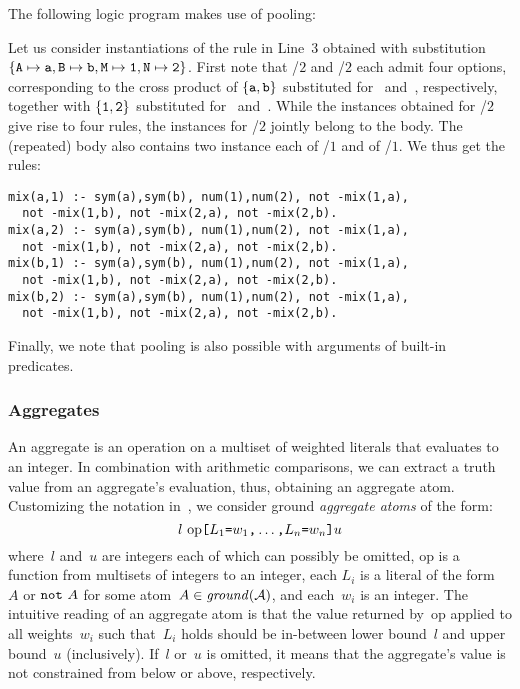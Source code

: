 \begin{example}\label{ex:pool}
The following logic program makes use of pooling:
%

%
Let us consider instantiations of the rule in Line~3 obtained with substitution 
$\{\var{A}\mapsto\const{a},\linebreak[1]\var{B}\mapsto\const{b},
   \var{M}\mapsto\const{1},\var{N}\mapsto\const{2}\}$.
First note that /$2$ and /$2$ each admit four options,
corresponding to the cross product of $\{\texttt{a},\texttt{b}\}$ substituted
for~ and~, respectively, together with $\{\texttt{1},\texttt{2}\}$
substituted for~ and~.
While the instances obtained for /$2$ give rise to four rules,
the instances for /$2$ jointly belong to the body.
The (repeated) body also contains two instance each of /$1$ and of /$1$.
We thus get the rules:%
%
\begin{lstlisting}[numbers=none]
mix(a,1) :- sym(a),sym(b), num(1),num(2), not -mix(1,a),
  not -mix(1,b), not -mix(2,a), not -mix(2,b).
mix(a,2) :- sym(a),sym(b), num(1),num(2), not -mix(1,a),
  not -mix(1,b), not -mix(2,a), not -mix(2,b).
mix(b,1) :- sym(a),sym(b), num(1),num(2), not -mix(1,a),
  not -mix(1,b), not -mix(2,a), not -mix(2,b).
mix(b,2) :- sym(a),sym(b), num(1),num(2), not -mix(1,a),
  not -mix(1,b), not -mix(2,a), not -mix(2,b).
\end{lstlisting}
%
Finally, we note that pooling is also possible with arguments of built-in predicates.
\eexample
\end{example}


\subsubsection{Aggregates}\label{subsec:gringo:aggregate}

An aggregate is an operation on a multiset of weighted literals that evaluates to an integer.
In combination with arithmetic comparisons, we can extract a truth value from
an aggregate's evaluation, thus, obtaining an aggregate atom.
Customizing the notation in~\cite{ferraris05a},
we consider ground \emph{aggregate atoms} of the form:
%
\begin{equation}\label{eq:aggregate:atom}
  l~ 
  \mathrm{op} 
  \texttt{[}
  L_1\texttt{=}w_1\texttt{,}
  \dots\texttt{,}
  L_n\texttt{=}w_n
  \texttt{]}
  u
\end{equation}
%
where~$l$ and~$u$ are integers each of which can possibly be omitted,
$\mathrm{op}$ is a function from multisets of integers to an integer,
each $L_i$ is a literal of the form~$A$ or $\texttt{not}~A$
for some atom~$A\in\mathit{ground}(\mathcal{A})$,
and each~$w_i$ is an integer.
The intuitive reading of an aggregate atom is that the value returned by~$\mathrm{op}$
applied to all weights~$w_i$ such that~$L_i$ holds should be in-between
lower bound~$l$ and upper bound~$u$ (inclusively).
If~$l$ or~$u$ is omitted,
it means that the aggregate's value is not constrained from below or above,
respectively.

